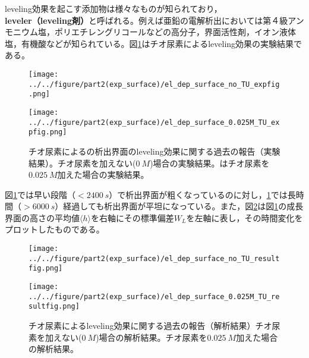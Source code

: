 \documentclass[autodetect-engine,dvi=dvipdfmx,a4paper,ja=standard,oneside,openany,11pt]{bxjsbook}
\begin{document}
leveling効果を起こす添加物は様々なものが知られており，\textbf{leveler（leveling剤）}と呼ばれる。例えば亜鉛の電解析出においては第４級アンモニウム塩，ポリエチレングリコールなどの高分子，界面活性剤，イオン液体塩，有機酸\cite{sorour2017review}などが知られている。図\ref{fig:leveling}はチオ尿素によるleveling効果の実験結果である\cite{schilardi1998evolution}。

\begin{figure}[htbp]
  \begin{minipage}
    {0.5\textwidth}
    \subcaption{}
    \centering
    \texttt{[image: ../../figure/part2(exp\_surface)/el\_dep\_surface\_no\_TU\_expfig.png]}
    \label{fig:no_leveling_effect}
  \end{minipage}
  \begin{minipage}
    {0.5\textwidth}
    \subcaption{}
    \centering
    \texttt{[image: ../../figure/part2(exp\_surface)/el\_dep\_surface\_0.025M\_TU\_expfig.png]}
    \label{fig:leveling_effect}
  \end{minipage}
  \caption{チオ尿素によるの析出界面のleveling効果に関する過去の報告（実験結果）\cite{schilardi1998evolution}。チオ尿素を加えない($\SI{0}{M}$)場合の実験結果。はチオ尿素を$\SI{0.025}{M}$加えた場合の実験結果。}
  \label{fig:leveling}
\end{figure}

図\ref{fig:leveling}では早い段階（$<\SI{2400}{s}$）で析出界面が粗くなっているのに対し，\ref{fig:leveling}では長時間（$>\SI{6000}{s}$）経過しても析出界面が平坦になっている。また，図\ref{fig:leveling_result}は図\ref{fig:leveling}の成長界面の高さの平均値$\langle h\rangle$を右軸にその標準偏差$W_L$を左軸に表し，その時間変化をプロットしたものである。

\begin{figure}[htbp]
  \begin{minipage}
    {0.5\textwidth}
    \subcaption{}
    \centering
    \texttt{[image: ../../figure/part2(exp\_surface)/el\_dep\_surface\_no\_TU\_resultfig.png]}
    \label{fig:no_leveling_effect_result}
  \end{minipage}
  \begin{minipage}
    {0.5\textwidth}
    \subcaption{}
    \centering
    \texttt{[image: ../../figure/part2(exp\_surface)/el\_dep\_surface\_0.025M\_TU\_resultfig.png]}
    \label{fig:leveling_effect_result}
  \end{minipage}
  \caption{チオ尿素によるleveling効果に関する過去の報告（解析結果）\cite{schilardi1998evolution}チオ尿素を加えない($\SI{0}{M}$)場合の解析結果。チオ尿素を$\SI{0.025}{M}$加えた場合の解析結果。}
  \label{fig:leveling_result}
\end{figure}
\end{document}
